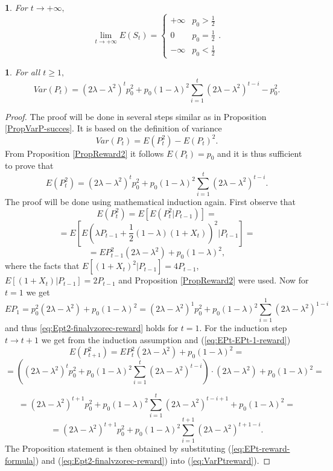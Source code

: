 \documentclass{amsart}
\theoremstyle{definition}
\theoremstyle{plain}
\newtheorem{prop}[thm]{\protect\propositionname}
\theoremstyle{plain}
\newtheorem{cor}[thm]{\protect\corollaryname}
\theoremstyle{plain}
\numberwithin{equation}{section}
\providecommand{\corollaryname}{Corollary}
\providecommand{\propositionname}{Proposition}
\begin{document}
\begin{cor}
For $t\rightarrow+\infty,$ \textup{
\[
\lim_{t\to+\infty}E(S_{t})=\begin{cases}
+\infty & p_{0}>\frac{1}{2}\\
0 & p_{0}=\frac{1}{2}\\
-\infty & p_{0}<\frac{1}{2}
\end{cases}.
\]
}
\end{cor}

\begin{prop}
For all $t\geq1,$
\begin{equation}
Var(P_{t})=(2\lambda-\lambda^{2})^{t}p_{0}^{2}+p_{0}(1-\lambda)^{2}\sum_{i=1}^{t}(2\lambda-\lambda^{2})^{t-i}-p_{0}^{2}.\label{eq:VarPt-reward-prop}
\end{equation}
\end{prop}
\begin{proof}
The proof will be done in several steps similar as in Proposition
\ref{PropVarP-succes}. It is based on the definition of variance
\begin{equation}
Var(P_{t})=E(P_{t}^{2})-E(P_{t})^{2}.\label{eq:VarPtreward}
\end{equation}
From Proposition \ref{PropReward2} it follows $E(P_{t})=p_{0}$ and
it is thus sufficient to prove that
\begin{equation}
E(P_{t}^{2})=(2\lambda-\lambda^{2})^{t}p_{0}^{2}+p_{0}(1-\lambda)^{2}\sum_{i=1}^{t}(2\lambda-\lambda^{2})^{t-i}.\label{eq:Ept2-finalvzorec-reward}
\end{equation}
The proof will be done using mathematical induction again. First observe that
\[
E(P_{t}^{2})=E[E(P_{t}^{2}|P_{t-1})]=
\]
\[
=E[E(\lambda P_{t-1}+\frac{1}{2}(1-\lambda)(1+X_{t}))^{2}|P_{t-1}]=
\]
\begin{equation}
=EP_{t-1}^{2}(2\lambda-\lambda^{2})+p_{0}(1-\lambda)^{2},\label{eq:EPt-EPt-1-reward}
\end{equation}
where the facts that $E[(1+X_{t})^{2}|P_{t-1}]=4P_{t-1}$, $E[(1+X_{t})|P_{t-1}]=2P_{t-1}$
and Proposition \ref{PropReward2} were used. Now for $t=1$ we get
\[
EP_{1}=p_{0}^{2}(2\lambda-\lambda^{2})+p_{0}(1-\lambda)^{2}=(2\lambda-\lambda^{2})^{1}p_{0}^{2}+p_{0}(1-\lambda)^{2}\sum_{i=1}^{1}(2\lambda-\lambda^{2})^{1-i}
\]
and thus \eqref{eq:Ept2-finalvzorec-reward} holds for $t=1$. For the induction step $t\rightarrow t+1$
we get from the induction assumption and (\ref{eq:EPt-EPt-1-reward})
\[
E(P_{t+1}^{2})=EP_{t}^{2}(2\lambda-\lambda^{2})+p_{0}(1-\lambda)^{2}=
\]
\[
=((2\lambda-\lambda^{2})^{t}p_{0}^{2}+p_{0}(1-\lambda)^{2}\sum_{i=1}^{t}(2\lambda-\lambda^{2})^{t-i})\cdot(2\lambda-\lambda^{2})+p_{0}(1-\lambda)^{2}=
\]

\[
=(2\lambda-\lambda^{2})^{t+1}p_{0}^{2}+p_{0}(1-\lambda)^{2}\sum_{i=1}^{t}(2\lambda-\lambda^{2})^{t-i+1}+p_{0}(1-\lambda)^{2}=
\]
\[
=(2\lambda-\lambda^{2})^{t+1}p_{0}^{2}+p_{0}(1-\lambda)^{2}\sum_{i=1}^{t+1}(2\lambda-\lambda^{2})^{t+1-i}.
\]
The Proposition statement is then obtained by substituting (\ref{eq:EPt-reward-formula})
and (\ref{eq:Ept2-finalvzorec-reward}) into (\ref{eq:VarPtreward}).
\end{proof}
\end{document}
